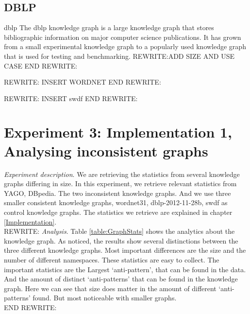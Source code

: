 \documentclass[11pt,letterpaper ,oneside ]{book}
\begin{document}
	\subsection{DBLP}
	dblp\cite{DBLP} The dblp knowledge graph is a large knowledge graph that stores bibliographic information on major computer science publications. It has grown from a small experimental knowledge graph to a popularly used knowledge graph that is used for testing and benchmarking.
	REWRITE:ADD SIZE AND USE CASE
	END REWRITE:
	
	REWRITE:
	INSERT WORDNET
	END REWRITE:
	
	REWRITE:
	INSERT swdf
	END REWRITE:
	
	\section{Experiment 3: Implementation 1, Analysing inconsistent graphs}
	\textit{Experiment description}. We are retrieving the statistics from several knowledge graphs differing in size. In this experiment, we retrieve relevant statistics from YAGO, DBpedia. The two inconsistent knowledge graphs. And we use three smaller consistent knowledge graphs, wordnet31, dblp-2012-11-28b, swdf as control knowledge graphs. The statistics we retrieve are explained in chapter \ref{Implementation}.  \\
	
	REWRITE:
	\textit{Analysis}. Table \ref{table:GraphStats} shows the analytics about the knowledge graph. As noticed, the results show several distinctions between the three different knowledge graphs. Most important differences are the size and the number of different namespaces. These statistics are easy to collect. The important statistics are the Largest `anti-pattern', that can be found in the data. And the amount of distinct `anti-patterns' that can be found in the knowledge graph. Here we can see that size does matter in the amount of different `anti-patterns' found. But most noticeable with smaller graphs. \\
	END REWRITE:
	
\end{document}

